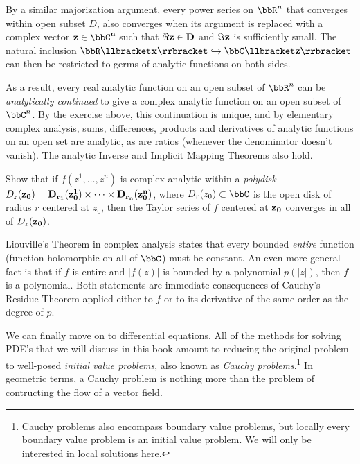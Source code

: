 By a similar majorization argument, every power series on $\bbR^n$ that converges within open subset $D$, also converges when its argument is replaced with a complex vector $\bf{z}\in\bbC^n$ such that $\Re \bf{z}\in D$ and $\Im\bf{z}$ is sufficiently small. The natural inclusion $\bbR\llbracket\bf{x}\rrbracket\hookrightarrow \bbC\llbracket\bf{z}\rrbracket$ can then be restricted to germs of analytic functions on both sides. 

As a result, every real analytic function on an open subset of $\bbR^n$ can be \emph{analytically continued} to give a complex analytic function on an open subset of $\bbC^n$. By the exercise above, this continuation is unique, and by elementary complex analysis, sums, differences, products and derivatives of analytic functions on an open set are analytic, as are ratios (whenever the denominator doesn't vanish). The analytic Inverse and Implicit Mapping Theorems also hold. 

\begin{xca}
    Show that if $f(z^1,\ldots,z^n)$ is complex analytic within a \emph{polydisk} $D_{\bf{r}}(\bf{z}_0)=D_{r_1}(z_0^1)\times\cdots \times D_{r_n}(z_0^n)$, where $D_r(z_0) \subset \bbC$ is the open disk of radius $r$ centered at $z_0$, then the Taylor series of $f$ centered at $\bf{z}_0$ converges in all of $D_{\bf{r}}(\bf{z}_0)$.
\end{xca}

\begin{example}
    Liouville's Theorem in complex analysis states that every bounded \emph{entire} function (function holomorphic on all of $\bbC$) must be constant. An even more general fact is that if $f$ is entire and $|f(z)|$ is bounded by a polynomial $p(|z|)$, then $f$ is a polynomial. Both statements are immediate consequences of Cauchy's Residue Theorem applied either to $f$ or to its derivative of the same order as the degree of $p$.
\end{example}


We can finally move on to differential equations. All of the methods for solving PDE's that we will discuss in this book amount to reducing the original problem to well-posed \emph{initial value problems}, also known as \emph{Cauchy problems}.\footnote{Cauchy problems also encompass boundary value problems, but locally every boundary value problem is an initial value problem. We will only be interested in local solutions here.} In geometric terms, a Cauchy problem is nothing more than the problem of contructing the flow of a vector field. 

